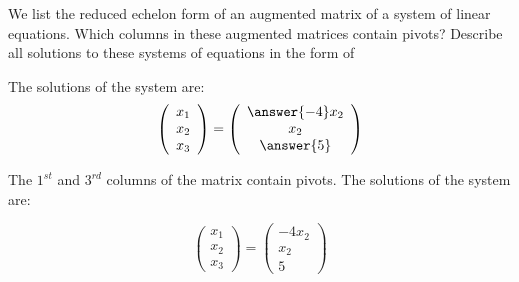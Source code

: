 \documentclass{ximera}
\begin{document}
\problemlabel

\noindent We list the reduced echelon form of an augmented matrix of a system of linear equations.  Which columns in these augmented matrices contain pivots?  Describe all solutions to these systems of equations in the form of %

     \begin{exercise}
       The solutions of the system are:
\[
\left(\begin{array}{r} x_1 \\ x_2 \\ x_3\end{array} \right)
= \left(\begin{array}{c} \answer{-4}x_2 \\ x_2 \\ \answer{5}\end{array} \right)
\]

\begin{solution}
The $1^{st}$ and $3^{rd}$ columns of the matrix contain
pivots.  The solutions of the system are:

\[
\left(\begin{array}{r} x_1 \\ x_2 \\ x_3\end{array} \right)
= \left(\begin{array}{c} -4x_2 \\ x_2 \\ 5\end{array} \right)
\]

\end{solution}
     \end{exercise}

\problemlabel
\end{document}
